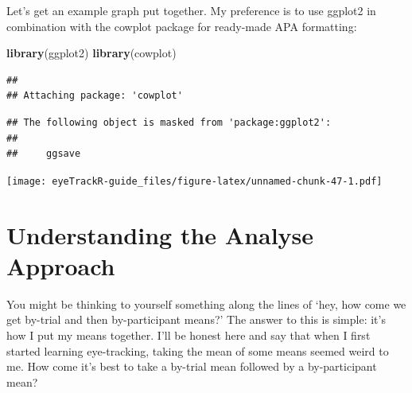 \documentclass[]{book}
\newenvironment{Shaded}{\begin{snugshade}}{\end{snugshade}}
\newcommand{\DataTypeTok}[1]{\textcolor[rgb]{0.13,0.29,0.53}{#1}}
\newcommand{\DecValTok}[1]{\textcolor[rgb]{0.00,0.00,0.81}{#1}}
\newcommand{\FloatTok}[1]{\textcolor[rgb]{0.00,0.00,0.81}{#1}}
\newcommand{\KeywordTok}[1]{\textcolor[rgb]{0.13,0.29,0.53}{\textbf{#1}}}
\newcommand{\NormalTok}[1]{#1}
\newcommand{\OperatorTok}[1]{\textcolor[rgb]{0.81,0.36,0.00}{\textbf{#1}}}
\newcommand{\StringTok}[1]{\textcolor[rgb]{0.31,0.60,0.02}{#1}}
\begin{document}
Let's get an example graph put together. My preference is to use ggplot2 in combination with the cowplot package for ready-made APA formatting:

\begin{Shaded}
\begin{Highlighting}[]
\KeywordTok{library}\NormalTok{(ggplot2)}
\KeywordTok{library}\NormalTok{(cowplot)}
\end{Highlighting}
\end{Shaded}

\begin{verbatim}
## 
## Attaching package: 'cowplot'
\end{verbatim}

\begin{verbatim}
## The following object is masked from 'package:ggplot2':
## 
##     ggsave
\end{verbatim}

\begin{Shaded}
\end{Shaded}

\texttt{[image: eyeTrackR-guide\_files/figure-latex/unnamed-chunk-47-1.pdf]}

\hypertarget{understanding-the-analyse-approach}{%
\section{Understanding the Analyse Approach}\label{understanding-the-analyse-approach}}

You might be thinking to yourself something along the lines of `hey, how come we get by-trial and then by-participant means?' The answer to this is simple: it's how I put my means together. I'll be honest here and say that when I first started learning eye-tracking, taking the mean of some means seemed weird to me. How come it's best to take a by-trial mean followed by a by-participant mean?
\end{document}
